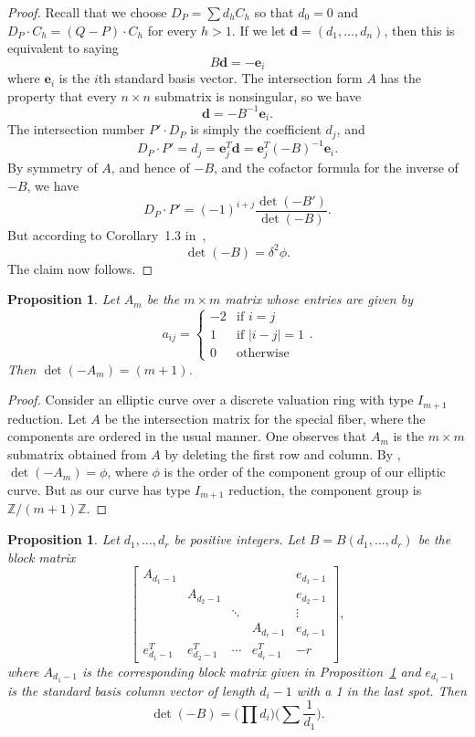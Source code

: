 \documentclass[reqno]{amsart}
\newtheorem{proposition}[thm]{Proposition}
\theoremstyle{definition}
\theoremstyle{remark}
\newcommand{\vd}{\mathbf{d}}
\newcommand{\ve}{\mathbf{e}}
\def\Z{\mathbb{Z}}
\begin{document}
\begin{proof}
  Recall that we choose $D_P = \sum d_h C_h$ so that $d_0 = 0$ and $D_P \cdot C_h = (Q - P) \cdot C_h$ for every $h > 1$. If we let $\vd = (d_1, \dots, d_n)$, then this is equivalent to saying
  \[
  B\vd = -\ve_i
  \]
  where $\ve_i$ is the $i$th standard basis vector. The intersection form $A$ has the property that every $n \times n$ submatrix is nonsingular, so we have
  \[
  \vd = -B^{-1}\ve_i.
  \]
  The intersection number $P' \cdot D_P$ is simply the coefficient $d_j$, and
  \[
  D_P \cdot P' = d_j = \ve_j^T \vd = \ve_j^T(-B)^{-1}\ve_i.
  \]
  By symmetry of $A$, and hence of $-B$, and the cofactor formula for the inverse of $-B$, we have
  \[
  D_P \cdot P' = (-1)^{i+j} \frac{\det(-B')}{\det(-B)}.
  \]
  But according to Corollary~1.3 in~\cite{lorenzini},
  \[
  \det (-B) = \delta^2 \phi.
  \]
  The claim now follows.
\end{proof}

\begin{proposition}\label{prop:am-defn-det}
  Let $A_m$ be the $m \times m$ matrix whose entries are given by
  \[
  a_{ij} = \begin{cases}
    -2 & \text{if } i = j \\
    1 & \text{if } |i - j| = 1\\
    0 & \text{otherwise}
  \end{cases}.
  \]
  Then $\det (-A_m) = (m+1)$.
\end{proposition}

\begin{proof}
  Consider an elliptic curve over a discrete valuation ring with type $I_{m+1}$ reduction. Let $A$ be the intersection matrix for the special fiber, where the components are ordered in the usual manner. One observes that $A_m$ is the $m \times m$ submatrix obtained from $A$ by deleting the first row and column. By \cite[Corollary~1.3]{lorenzini}, $\det (-A_m) = \phi$, where $\phi$ is the order of the component group of our elliptic curve. But as our curve has type $I_{m+1}$ reduction, the component group is $\Z/(m+1)\Z$.
\end{proof}

\begin{proposition}\label{prop:block-Am-determinant}
  Let $d_1, \dots, d_r$ be positive integers. Let $B = B(d_1, \dots, d_r)$ be the block matrix
  \[
  \left[\begin{array}{ccccc}
    A_{d_{1}-1} & & & & e_{d_{1}-1} \\
    & A_{d_{2}-1} & & & e_{d_{2}-1} \\
    & & \ddots & & \vdots \\
    & & & A_{d_{r}-1} & e_{d_{r}-1} \\
    e_{d_{1}-1}^T & e_{d_{2}-1}^T & \cdots & e_{d_{r}-1}^T & -r
  \end{array}\right],
  \]
  where $A_{d_{1}-1}$ is the corresponding block matrix given in Proposition~\ref{prop:am-defn-det} and $e_{d_{i}-1}$ is the standard basis column vector of length $d_i-1$ with a 1 in the last spot. Then
  \[
  \det (-B) = \bigg(\prod d_i\bigg)\bigg(\sum \frac{1}{d_1}\bigg).
  \]
\end{proposition}
\end{document}
